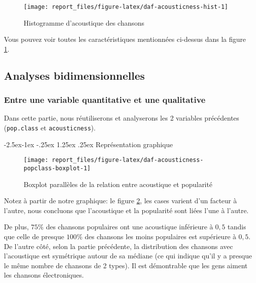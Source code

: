 \documentclass[
  11pt,
  xcolor = usenames,dvipsnames]{article}
\makeatletter
\newcommand{\passthrough}[1]{#1}
\renewcommand\paragraph{\@startsection{paragraph}{4}{\z@}%
        {-2.5ex\@plus -1ex \@minus -.25ex}%
        {1.25ex \@plus .25ex}%
        {\normalfont\normalsize\bfseries}}
\makeatother
\begin{document}
\begin{figure}

{\centering \texttt{[image: report\_files/figure-latex/daf-acousticness-hist-1]} 

}

\caption{Histogramme d'acoustique des chansons}\label{fig:daf-acousticness-hist}
\end{figure}

Vous pouvez voir toutes les caractéristiques mentionnées ci-dessus dans la figure \ref{fig:daf-acousticness-hist}.

\hypertarget{analyses-bidimensionnelles}{%
\subsection{Analyses bidimensionnelles}\label{analyses-bidimensionnelles}}

\hypertarget{entre-une-variable-quantitative-et-une-qualitative}{%
\subsubsection{Entre une variable quantitative et une qualitative}\label{entre-une-variable-quantitative-et-une-qualitative}}

Dans cette partie, nous réutiliserons et analyserons les 2 variables précédentes (\passthrough{\lstinline!pop.class!} et \passthrough{\lstinline!acousticness!}).

\hypertarget{repruxe9sentation-graphique}{%
\paragraph{Représentation graphique}\label{repruxe9sentation-graphique}}

\begin{figure}

{\centering \texttt{[image: report\_files/figure-latex/daf-acousticness-popclass-boxplot-1]} 

}

\caption{Boxplot parallèles de la relation entre acoustique et popularité}\label{fig:daf-acousticness-popclass-boxplot}
\end{figure}

Notez à partir de notre graphique: le figure \ref{fig:daf-acousticness-popclass-boxplot}, les cases varient d'un facteur à l'autre,
nous concluons que l'acoustique et la popularité sont liées l'une à l'autre.

De plus, \(75\%\) des chansons populaires ont une acoustique inférieure à \(0,5\) tandis que celle de presque \(100\%\) des chansons les moins populaires est supérieure à \(0,5\).
De l'autre côté, selon la partie précédente, la distribution des chansons avec l'acoustique est symétrique autour de sa médiane (ce qui indique qu'il y a presque le même nombre de chansons de 2 types).
Il est démontrable que les gens aiment les chansons électroniques.
\end{document}
